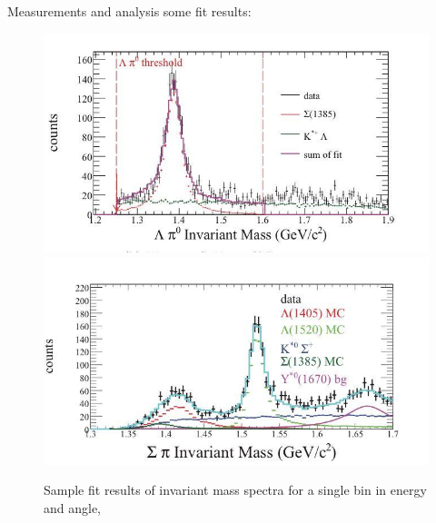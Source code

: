 \documentclass[11pt,aspectratio=1610,dvipsnames]{beamer}
\begin{document}
\begin{frame}{Measurements and analysis}
some fit results:
\begin{figure}
	\centering
	\includegraphics[width=.49\linewidth]{inv_mass_res1}
	\includegraphics[width=.49\linewidth]{inv_mass_res2}
	\caption*{ Sample fit results of invariant mass spectra for a single bin in energy and angle,  \citet{lineshapes}}
	
\end{figure}
\end{frame}
\end{document}
